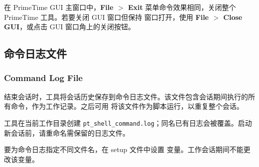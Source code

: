 在 PrimeTime GUI 主窗口中，\textbf{File $>$ Exit} 菜单命令效果相同，关闭整个 PrimeTime 工具。若要关闭 GUI 窗口但保持  窗口打开，使用 \textbf{File $>$ Close GUI}，或点击 GUI 窗口角上的关闭按钮。

\subsection{命令日志文件}
\subsubsection*{Command Log File}

结束会话时，工具将会话历史保存到命令日志文件。该文件包含会话期间执行的所有命令，作为工作记录。之后可用  将该文件作为脚本运行，以重复整个会话。

工具在当前工作目录创建 \texttt{pt\_shell\_command.log}；同名已有日志会被覆盖。启动新会话前，请重命名需保留的日志文件。

要为命令日志指定不同文件名，在 setup 文件中设置  变量。工作会话期间不能更改该变量。

